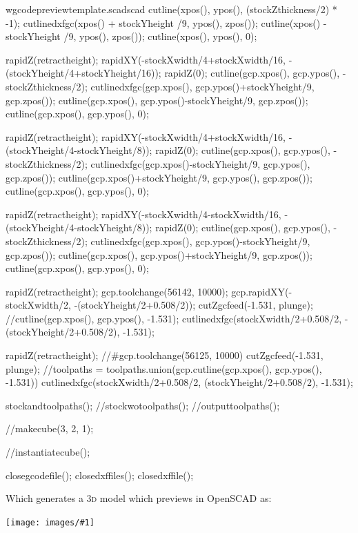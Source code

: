 \documentclass{ltxdoc}
\newcommand{\includeimage}[1]{\bigskip\noindent\texttt{[image: images/\#1]}\bigskip}
\begin{document}
\begin{writecode}{w}{gcodepreviewtemplate.scad}{scad}
cutline(xpos(), ypos(), (stockZthickness/2) * -1);
cutlinedxfgc(xpos() + stockYheight /9, ypos(), zpos());
cutline(xpos() - stockYheight /9, ypos(), zpos());
cutline(xpos(), ypos(), 0);

rapidZ(retractheight);
rapidXY(-stockXwidth/4+stockXwidth/16, -(stockYheight/4+stockYheight/16));
rapidZ(0);
cutline(gcp.xpos(), gcp.ypos(), -stockZthickness/2);
cutlinedxfgc(gcp.xpos(), gcp.ypos()+stockYheight/9, gcp.zpos());
cutline(gcp.xpos(), gcp.ypos()-stockYheight/9, gcp.zpos());
cutline(gcp.xpos(), gcp.ypos(), 0);

rapidZ(retractheight);
rapidXY(-stockXwidth/4+stockXwidth/16, -(stockYheight/4-stockYheight/8));
rapidZ(0);
cutline(gcp.xpos(), gcp.ypos(), -stockZthickness/2);
cutlinedxfgc(gcp.xpos()-stockYheight/9, gcp.ypos(), gcp.zpos());
cutline(gcp.xpos()+stockYheight/9, gcp.ypos(), gcp.zpos());
cutline(gcp.xpos(), gcp.ypos(), 0);

rapidZ(retractheight);
rapidXY(-stockXwidth/4-stockXwidth/16, -(stockYheight/4-stockYheight/8));
rapidZ(0);
cutline(gcp.xpos(), gcp.ypos(), -stockZthickness/2);
cutlinedxfgc(gcp.xpos(), gcp.ypos()-stockYheight/9, gcp.zpos());
cutline(gcp.xpos(), gcp.ypos()+stockYheight/9, gcp.zpos());
cutline(gcp.xpos(), gcp.ypos(), 0);



rapidZ(retractheight);
gcp.toolchange(56142, 10000);
gcp.rapidXY(-stockXwidth/2, -(stockYheight/2+0.508/2));
cutZgcfeed(-1.531, plunge);
//cutline(gcp.xpos(), gcp.ypos(), -1.531);
cutlinedxfgc(stockXwidth/2+0.508/2, -(stockYheight/2+0.508/2), -1.531);

rapidZ(retractheight);
//#gcp.toolchange(56125, 10000)
cutZgcfeed(-1.531, plunge);
//toolpaths = toolpaths.union(gcp.cutline(gcp.xpos(), gcp.ypos(), -1.531))
cutlinedxfgc(stockXwidth/2+0.508/2, (stockYheight/2+0.508/2), -1.531);

stockandtoolpaths();
//stockwotoolpaths();
//outputtoolpaths();

//makecube(3, 2, 1);

//instantiatecube();

closegcodefile();
closedxffiles();
closedxffile();

\end{writecode}
\addtocounter{gcptmpl}{131}

\begin{samepage}
\noindent Which generates a \textsc{3d} model which previews in OpenSCAD as:

\bigskip

\includeimage{gcodepreview_unittests_scad.png}
\end{samepage}
\end{document}
